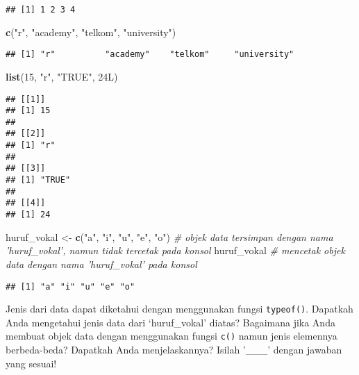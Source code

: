 \documentclass[]{article}
\newenvironment{Shaded}{\begin{snugshade}}{\end{snugshade}}
\newcommand{\KeywordTok}[1]{\textcolor[rgb]{0.13,0.29,0.53}{\textbf{#1}}}
\newcommand{\DecValTok}[1]{\textcolor[rgb]{0.00,0.00,0.81}{#1}}
\newcommand{\StringTok}[1]{\textcolor[rgb]{0.31,0.60,0.02}{#1}}
\newcommand{\CommentTok}[1]{\textcolor[rgb]{0.56,0.35,0.01}{\textit{#1}}}
\newcommand{\NormalTok}[1]{#1}
\begin{document}
\begin{verbatim}
## [1] 1 2 3 4
\end{verbatim}

\begin{Shaded}
\begin{Highlighting}[]
\KeywordTok{c}\NormalTok{(}\StringTok{"r"}\NormalTok{, }\StringTok{"academy"}\NormalTok{, }\StringTok{"telkom"}\NormalTok{, }\StringTok{"university"}\NormalTok{)}
\end{Highlighting}
\end{Shaded}

\begin{verbatim}
## [1] "r"          "academy"    "telkom"     "university"
\end{verbatim}

\begin{Shaded}
\begin{Highlighting}[]
\KeywordTok{list}\NormalTok{(}\DecValTok{15}\NormalTok{, }\StringTok{"r"}\NormalTok{, }\StringTok{"TRUE"}\NormalTok{, 24L)}
\end{Highlighting}
\end{Shaded}

\begin{verbatim}
## [[1]]
## [1] 15
## 
## [[2]]
## [1] "r"
## 
## [[3]]
## [1] "TRUE"
## 
## [[4]]
## [1] 24
\end{verbatim}

\begin{Shaded}
\begin{Highlighting}[]
\NormalTok{huruf_vokal <-}\StringTok{ }\KeywordTok{c}\NormalTok{(}\StringTok{"a"}\NormalTok{, }\StringTok{"i"}\NormalTok{, }\StringTok{"u"}\NormalTok{, }\StringTok{"e"}\NormalTok{, }\StringTok{"o"}\NormalTok{) }\CommentTok{# objek data tersimpan dengan nama 'huruf_vokal', namun tidak tercetak pada konsol}
\NormalTok{huruf_vokal }\CommentTok{# mencetak objek data dengan nama 'huruf_vokal' pada konsol}
\end{Highlighting}
\end{Shaded}

\begin{verbatim}
## [1] "a" "i" "u" "e" "o"
\end{verbatim}

Jenis dari data dapat diketahui dengan menggunakan fungsi
\texttt{typeof()}. Dapatkah Anda mengetahui jenis data dari
`huruf\_vokal' diatas? Bagaimana jika Anda membuat objek data dengan
menggunakan fungsi \texttt{c()} namun jenis elemennya berbeda-beda?
Dapatkah Anda menjelaskannya? Isilah '\_\_\_' dengan jawaban yang
sesuai!
\end{document}
